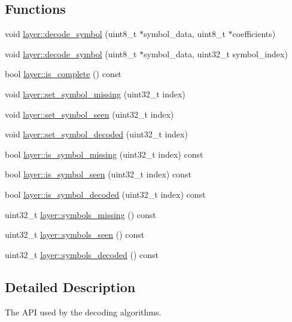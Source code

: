 \subsection*{Functions}
\begin{DoxyCompactItemize}
\item 
void \hyperlink{group__decoder__api_gae28d93bf78534b4f4f4052ad6b1f7a4d}{layer\-::decode\-\_\-symbol} (uint8\-\_\-t $\ast$symbol\-\_\-data, uint8\-\_\-t $\ast$coefficients)
\item 
void \hyperlink{group__decoder__api_ga14ba28f27d03e2eee864bc7eed6cb188}{layer\-::decode\-\_\-symbol} (uint8\-\_\-t $\ast$symbol\-\_\-data, uint32\-\_\-t symbol\-\_\-index)
\item 
bool \hyperlink{group__decoder__api_gaa6d386c2d13c68f68d487bdb98d554dd}{layer\-::is\-\_\-complete} () const 
\item 
void \hyperlink{group__decoder__api_ga9fb83cc2102d40006c0259088f9cb41e}{layer\-::set\-\_\-symbol\-\_\-missing} (uint32\-\_\-t index)
\item 
void \hyperlink{group__decoder__api_gaf20c3a2144fa7808bfe373df00314a29}{layer\-::set\-\_\-symbol\-\_\-seen} (uint32\-\_\-t index)
\item 
void \hyperlink{group__decoder__api_ga73bcee98c996a379da824eb9a79bec52}{layer\-::set\-\_\-symbol\-\_\-decoded} (uint32\-\_\-t index)
\item 
bool \hyperlink{group__decoder__api_gaab2e19b7b423caddbb49b20f1adc9cc2}{layer\-::is\-\_\-symbol\-\_\-missing} (uint32\-\_\-t index) const 
\item 
bool \hyperlink{group__decoder__api_ga5c012c968ab573a73b4f9e0398672633}{layer\-::is\-\_\-symbol\-\_\-seen} (uint32\-\_\-t index) const 
\item 
bool \hyperlink{group__decoder__api_gae4e6fba10d31bdd30b40f80d614faa4d}{layer\-::is\-\_\-symbol\-\_\-decoded} (uint32\-\_\-t index) const 
\item 
uint32\-\_\-t \hyperlink{group__decoder__api_gafdea353ad42397a2d1f992b590e0111d}{layer\-::symbols\-\_\-missing} () const 
\item 
uint32\-\_\-t \hyperlink{group__decoder__api_ga75cf4d30b8f42f103a0140b0a2a65316}{layer\-::symbols\-\_\-seen} () const 
\item 
uint32\-\_\-t \hyperlink{group__decoder__api_ga3a3785c55a9450955473ea46c8d7afb7}{layer\-::symbols\-\_\-decoded} () const 
\end{DoxyCompactItemize}


\subsection{Detailed Description}
The A\-P\-I used by the decoding algorithms. 

